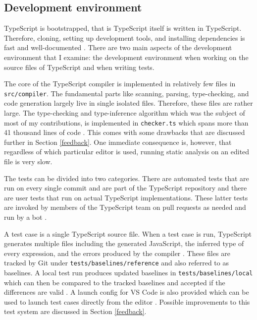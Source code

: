 \documentclass[12pt]{scrartcl}
\def\code#1{\texttt{\frenchspacing#1}}
\begin{document}
\subsection{Development environment}

TypeScript is bootstrapped, that is TypeScript itself is written in TypeScript. Therefore, cloning, setting up development tools, and installing dependencies is fast and well-documented \cite{ContributingGuidelines}. There are two main aspects of the development environment that I examine: the development environment when working on the source files of TypeScript and when writing tests.

The core of the TypeScript compiler is implemented in relatively few files in \break\code{src/compiler}. The fundamental parts like scanning, parsing, type-checking, and code generation largely live in single isolated files. Therefore, these files are rather large. The type-checking and type-inference algorithm which was the subject of most of my contributions, is implemented in \code{checker.ts} which spans more than 41 thousand lines of code \cite{CheckerFile}. This comes with some drawbacks that are discussed further in Section \ref{feedback}. One immediate consequence is, however, that regardless of which particular editor is used, running static analysis on an edited file is very slow.

The tests can be divided into two categories. There are automated tests that are run on every single commit and are part of the TypeScript repository \cite{ContributingGuidelines} and there are user tests that run on actual TypeScript implementations. These latter tests are invoked by members of the TypeScript team on pull requests as needed and run by a bot \cite{UserTests}.

A test case is a single TypeScript source file. When a test case is run, TypeScript generates multiple files including the generated JavaScript, the inferred type of every expression, and the errors produced by the compiler \cite{ContributingGuidelines}. These files are tracked by Git under \code{tests/baselines/reference} and also referred to as baselines. A local test run produces updated baselines in \code{tests/baselines/local} which can then be compared to the tracked baselines and accepted if the differences are valid \cite{ContributingGuidelines}. A launch config for VS Code is also provided which can be used to launch test cases directly from the editor \cite{ContributingGuidelines}. Possible improvements to this test system are discussed in Section \ref{feedback}.
\end{document}

